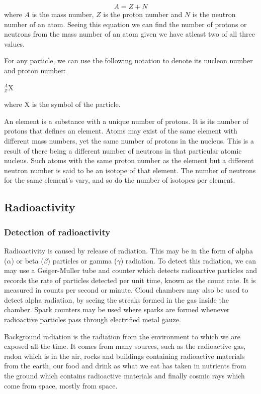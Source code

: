 \[A = Z + N\]
where $A$ is the mass number, $Z$ is the proton number and $N$ is the neutron number of an
atom. Seeing this equation we can find the number of protons or neutrons from the mass number of an
atom given we have atleast two of all three values.

For any particle, we can use the following notation to denote its nucleon number and proton number:
\begin{center}
	$^A_Z$X
\end{center}
where X is the symbol of the particle.

An element is a substance with a unique number of protons. It is its number of protons that defines
an element. Atoms may exist of the same element with different mass numbers, yet the same number
of protons in the nucleus. This is a result of there being a different number of neutrons in that
particular atomic nucleus. Such atoms with the same proton number as the element but a different
neutron number is said to be an isotope of that element. The number of neutrons for the same 
element's vary, and so do the number of isotopes per element.

\subsection{Radioactivity}
\subsubsection{Detection of radioactivity}
Radioactivity is caused by release of radiation. This may be in the form of alpha ($\alpha$) or beta
($\beta$) particles or gamma ($\gamma$) radiation. To detect this radiation, we can may use a 
Geiger-Muller tube and counter which detects radioactive particles and records the rate of 
particles detected per unit time, known as the count rate. It is measured in counts per second or
minute. Cloud chambers may also be used to detect alpha radiation, by seeing the streaks formed in
the gas inside the chamber. Spark counters may be used where sparks are formed whenever radioactive
particles pass through electrified metal gauze.

Background radiation is the radiation from the environment to which we are exposed all the time. It
comes from many sources, such as the radioactive gas, radon which is in the air, rocks and 
buildings containing radioactive materials from the earth, our food and drink as what we eat has
taken in nutrients from the ground which contains radioactive materials and finally cosmic rays 
which come from space, mostly from space. 

